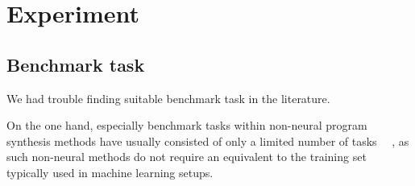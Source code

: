 \documentclass{article}
\begin{document}
\section{Experiment} %

\subsection{Benchmark task}


We had trouble finding suitable benchmark task in the literature.

On the one hand, especially benchmark tasks within non-neural program synthesis methods have usually consisted of only a limited number of tasks%
~\citep{myth,lambda2,typedmil,houdini,tamandu,dilp}~\cite{terpret},
as such non-neural methods do not require an equivalent to the training set typically used in machine learning setups.
\end{document}
